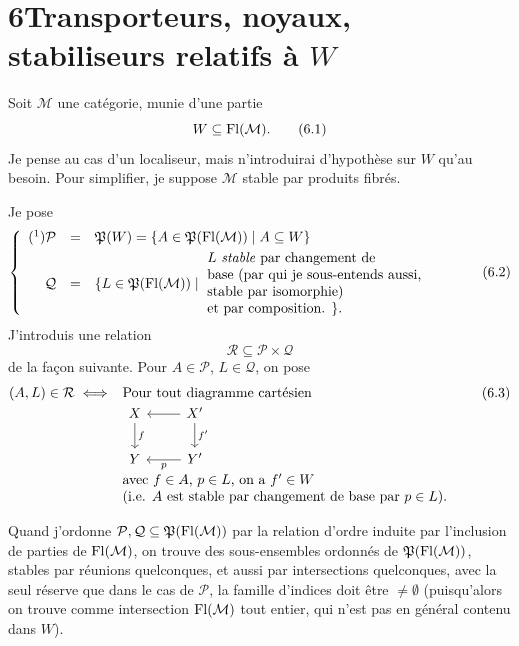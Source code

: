 \section*{6\quad Transporteurs, noyaux, stabiliseurs relatifs à $W$}

Soit $\mathcal{M}$ une catégorie, munie d'une partie
\[
W\subseteq\Fl(\mathcal{M}).
\tag*{(6.1)}
\]
Je pense au cas d'un localiseur, mais n'introduirai d'hypothèse sur $W$ qu'au besoin. Pour simplifier, je suppose $\mathcal{M}$ stable par produits fibrés.

Je pose
\[
\left\{
\begin{array}{rcl}
\mbox{(\footnotemark)}\mathcal{P} & = & \Pf(W)=\{A\in\Pf(\Fl(\mathcal{M}))\mid A\subseteq W\}\\[1ex]
\mathcal{Q} & = & \{L\in\Pf(\Fl(\mathcal{M}))\mid\
\parbox[c]{17em}{$L$ \textit{stable} par changement de\\
base (par qui je sous-entends aussi,\\
stable par isomorphie)\\
et par composition. $\}$.}
\end{array}
\right.
\tag*{(6.2)}
\]
J'introduis une relation
\[
\mathcal{R}\subseteq\mathcal{P}\times\mathcal{Q}
\]
de la façon suivante. Pour $A\in\mathcal{P}$, $L\in\mathcal{Q}$, on pose
\[
(A,L)\in\mathcal{R}\iff
\begin{array}[t]{l}
\text{Pour tout diagramme cartésien}\\
\begin{tikzcd}[ampersand replacement=\&]
X \arrow[d, "f"] \& X' \arrow[l] \arrow[d, "f'"] \\
Y \& Y' \arrow[l, "p"]
\end{tikzcd}\\
\text{avec $f\in A$, $p\in L$, on a $f'\in W$}\\
\text{(i.e. $A$ est stable par changement de base par $p\in L$).}
\end{array}
\tag*{(6.3)}
\]

Quand j'ordonne $\mathcal{P},\mathcal{Q}\subseteq\mathfrak{P}(\mathrm{Fl}(\mathcal{M}))$ par la relation d'ordre induite par l'inclusion de parties de $\mathrm{Fl}(\mathcal{M})$, on trouve des sous-ensembles ordonnés de $\mathfrak{P}(\mathrm{Fl}(\mathcal{M}))$, stables par réunions quelconques, et aussi par intersections quelconques, avec la seul réserve que dans le cas de $\mathcal{P}$, la famille d'indices doit être $\neq\emptyset$ (puisqu'alors on trouve comme intersection $\mathrm{Fl}(\mathcal{M})$ tout entier, qui n'est pas en général contenu dans $W$). %

